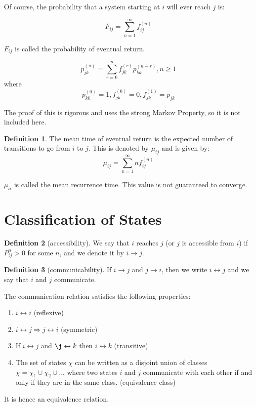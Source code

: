 \documentclass[12pt,letterpaper]{book}
\theoremstyle{definition}
\newtheorem{definition}{Definition}%
\begin{document}
Of course, the probability that a system starting at $i$ will ever reach $j$ is:

\[F_{ij} = \sum_{n=1}^{\infty} f_{ij}^{(n)}\]

$F_{ij}$ is called the probability of eventual return.

\begin{theorem}
  \[p_{jk}^{(n)} = \sum_{r=0}^n f_{jk}^{(r)}p_{kk}^{(n-r)}, n \geq 1\]
  where
  \[p_{kk}^{(0)} = 1, f_{jk}^{(0)} = 0, f_{jk}^{(1)} = p_{jk}\]
\end{theorem}

The proof of this is rigorous and uses the strong Markov Property, so it is not included here.


\begin{definition}
The mean time of eventual return is the expected number of transitions to go from $i$ to $j$. This is denoted by $\mu_{ij}$ and is given by:
\[\mu_{ij} = \sum_{n=1}^{\infty} n f_{ij}^{(n)}\]
\end{definition}

$\mu_{ii}$ is called the mean recurrence time. This value is not guaranteed to converge.

\section{Classification of States}

\begin{definition}[accessibility]
  We say that $i$ reaches $j$ (or $j$ is accessible from $i$) if $P^{n}_{ij} > 0$ for some $n$, and we denote it by $i \rightarrow j$.
\end{definition}

\begin{definition}  [communicability]
  If $i \rightarrow j$ and $j \rightarrow i$, then we write $i \leftrightarrow j$ and we say that $i$ and $j$ communicate.
\end{definition}

\begin{theorem}
  The communication relation satisfies the following properties:
  \begin{enumerate}
    \item $i \leftrightarrow i$ (reflexive)
    \item $i \leftrightarrow j \Rightarrow j \leftrightarrow i$ (symmetric)
    \item If $i \leftrightarrow j$ and $\j \leftrightarrow k$ then $i \leftrightarrow k$ (transitive)
    \item The set of states $\chi$ can be written as a disjoint union of classes $\chi = \chi_1 \cup \chi_2 \cup ...$ where two states $i$ and $j$ communicate with each other if and only if they are in the same class. (equivalence class)
  \end{enumerate}
  It is hence an equivalence relation.
\end{theorem}
\end{document}
